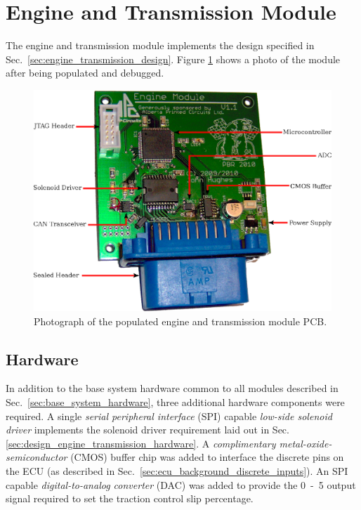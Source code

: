 \section{Engine and Transmission Module}

The engine and transmission module implements the design specified in Sec.\ \ref{sec:engine_transmission_design}. Figure \ref{fig:engine_transmission_pcb} shows a photo of the module after being populated and debugged.

\begin{figure}[H]
\centering
\includegraphics[scale=1]{implementation/figures/engine_transmission_pcb}
\caption{Photograph of the populated engine and transmission module PCB.}
\label{fig:engine_transmission_pcb}
\end{figure}

\subsection{Hardware}

In addition to the base system hardware common to all modules described in Sec.\ \ref{sec:base_system_hardware}, three additional hardware components were required. A single \emph{serial peripheral interface} (SPI) capable \emph{low-side solenoid driver} implements the solenoid driver requirement laid out in Sec. \ref{sec:design_engine_transmission_hardware}. A \emph{complimentary metal-oxide-semiconductor} (CMOS) buffer chip was added to interface the discrete pins on the ECU (as described in Sec.\ \ref{sec:ecu_background_discrete_inputs}). An SPI capable \emph{digital-to-analog converter} (DAC) was added to provide the \unit{0-5}{\volt} output signal required to set the traction control slip percentage.

